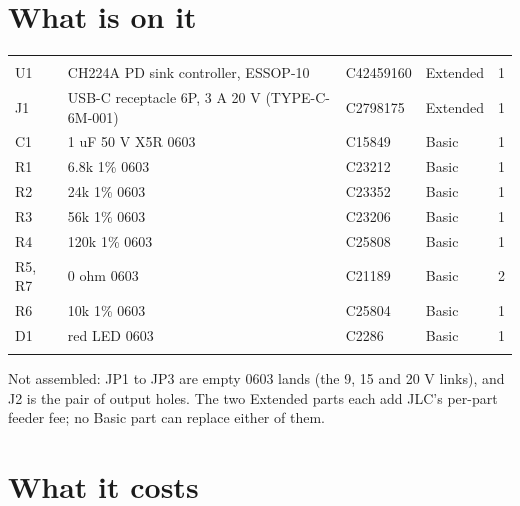 \newpage
\section{What is on it}

\begin{hsblock}
\begin{tabularx}{\linewidth}{L{1.9cm}Y L{2.0cm}L{1.6cm}R{0.8cm}}
\hstoprule
{} &  &  &  &  \\
\hstoprule
U1 & CH224A PD sink controller, ESSOP-10 & C42459160 & Extended & 1 \\ \hline
J1 & USB-C receptacle 6P, 3 A 20 V (TYPE-C-6M-001) & C2798175 & Extended & 1 \\ \hline
C1 & 1 uF 50 V X5R 0603 & C15849 & Basic & 1 \\ \hline
R1 & 6.8k 1\% 0603 & C23212 & Basic & 1 \\ \hline
R2 & 24k 1\% 0603 & C23352 & Basic & 1 \\ \hline
R3 & 56k 1\% 0603 & C23206 & Basic & 1 \\ \hline
R4 & 120k 1\% 0603 & C25808 & Basic & 1 \\ \hline
R5, R7 & 0 ohm 0603 & C21189 & Basic & 2 \\ \hline
R6 & 10k 1\% 0603 & C25804 & Basic & 1 \\ \hline
D1 & red LED 0603 & C2286 & Basic & 1 \\
\hstoprule
\end{tabularx}
\end{hsblock}

Not assembled: JP1 to JP3 are empty 0603 lands (the 9, 15 and 20 V links), and J2 is the pair of
output holes. The two Extended parts each add JLC's per-part feeder fee; no Basic part can replace
either of them.

\section{What it costs}

\begin{hsstatrow}[3]
\end{hsstatrow}

